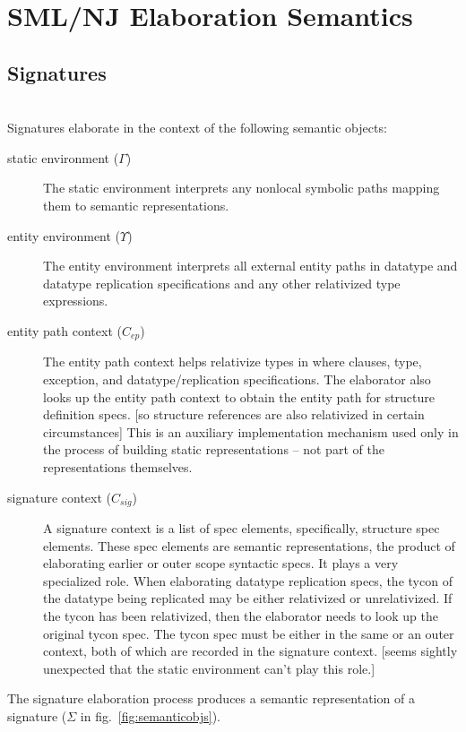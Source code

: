 


\chapter{SML/NJ Elaboration Semantics}\label{ch:smlnjsem}
\section{Signatures}
\\
Signatures elaborate in the context of the following semantic objects:
\begin{description}
	\item[static environment ($\Gamma$)] The static environment interprets any nonlocal symbolic paths mapping them to semantic representations.
	\item[entity environment ($\Upsilon$)] The entity environment interprets all external entity paths in datatype and datatype replication specifications and any other relativized type expressions. 
	\item[entity path context ($C_{ep}$)] The entity path context helps relativize types in where clauses, type, exception, and datatype/replication specifications. The elaborator also looks up the entity path context to obtain the entity path for structure definition specs. [so structure references are also relativized in certain circumstances] This is an auxiliary implementation mechanism used only in the process of building static representations -- not part of the representations themselves. 
        \item[signature context ($C_{sig}$)] A signature context is a list of spec elements, specifically, structure spec elements. These spec elements are semantic representations, the product of elaborating earlier or outer scope syntactic specs. It plays a very specialized role. When elaborating datatype replication specs, the tycon of the datatype being replicated may be either relativized or unrelativized. If the tycon has been relativized, then the elaborator needs to look up the original tycon spec. The tycon spec must be either in the same or an outer context, both of which are recorded in the signature context. [seems sightly unexpected that the static environment can't play this role.]
\end{description}
The signature elaboration process produces a semantic representation of a signature ($\Sigma$ in fig.~\ref{fig:semanticobjs}). 

